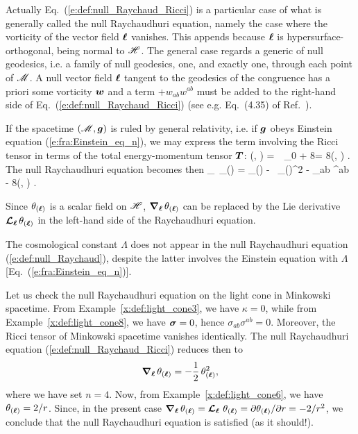 \begin{remark}
Actually Eq.~(\ref{e:def:null_Raychaud_Ricci}) is a particular case of
what is generally called the null Raychaudhuri equation, namely the case where
the vorticity of the vector field $\bm{\ell}$ vanishes. This
appends because $\bm{\ell}$ is hypersurface-orthogonal, being normal to $\mathscr{H}$.
The general case regards a generic
 of null
geodesics, i.e. a family of null geodesics, one, and exactly one, through
each point of $\mathscr{M}$. A null vector field $\bm{\ell}$ tangent to the geodesics
of the congruence has a priori some vorticity $\bm{w}$ and a term
$+w_{ab} w^{ab}$ must be added to the right-hand side of
Eq.~(\ref{e:def:null_Raychaud_Ricci}) (see e.g. Eq.~(4.35) of Ref.~\cite{HawkiE73}).
\end{remark}

If the spacetime $(\mathscr{M},\bm{g})$ is ruled by general relativity, i.e. if
$\bm{g}$ obeys Einstein equation (\ref{e:fra:Einstein_eq_n}), we may express
the term involving the Ricci tensor in terms of the total energy-momentum tensor
$\bm{T}$:
\be \label{e:def:Rll_Tll}
  (\wl, \wl)  = \,\Lambda\,  _{0}
    + 8\pi {}
    = 8\pi {}(\wl, \wl) .
\ee
The null Raychaudhuri equation becomes then
\be \label{e:def:null_Raychaud}
     \wnab_{\wl}\,  \theta_{(\wl)} = \kappa \theta_{(\wl)}
        -  \, \theta_{(\wl)}^2 - \sigma_{ab} \sigma^{ab}
        - 8\pi {}(\wl, \wl) .
\ee

\begin{remark}
Since $\theta_{(\bm{\ell})}$ is a scalar field on $\mathscr{H}$, $\bm{\nabla}_{\bm{\ell}}\,  \theta_{(\bm{\ell})}$
can be replaced by the Lie derivative $\bm{\mathcal{L}}_{\bm{\bm{\ell}}}\, \theta_{(\bm{\ell})}$ in the left-hand side of the Raychaudhuri
equation.
\end{remark}

\begin{remark}
The cosmological constant $\Lambda$ does not appear in
the null Raychaudhuri equation (\ref{e:def:null_Raychaud}), despite the
latter involves the Einstein equation with $\Lambda$
[Eq.~(\ref{e:fra:Einstein_eq_n})].
\end{remark}


\begin{example}
Let us check the null Raychaudhuri equation on the light cone in Minkowski
spacetime. From Example~\ref{x:def:light_cone3}, we have $\kappa=0$, while
from Example~\ref{x:def:light_cone8}, we have $\bm{\sigma}=0$,
hence $\sigma_{ab} \sigma^{ab}=0$. Moreover, the Ricci tensor of Minkowski
spacetime vanishes identically. The null Raychaudhuri equation
(\ref{e:def:null_Raychaud_Ricci})
reduces then to
\[
    \bm{\nabla}_{\bm{\ell}}\,  \theta_{(\bm{\ell})} =  - \frac{1}{2} \, \theta_{(\bm{\ell})}^2 ,
\]
where we have set $n=4$. Now, from Example~\ref{x:def:light_cone6}, we
have $\theta_{(\bm{\ell})} = 2/r$. Since, in the present case
$\bm{\nabla}_{\bm{\ell}}\,  \theta_{(\bm{\ell})}  = \bm{\mathcal{L}}_{\bm{\ell}}\, \,  \theta_{(\bm{\ell})}  = {\partial \theta_{(\bm{\ell})}}/{\partial r} =
- 2/r^2$, we conclude that the null Raychaudhuri equation is satisfied (as
it should!).
\end{example}

